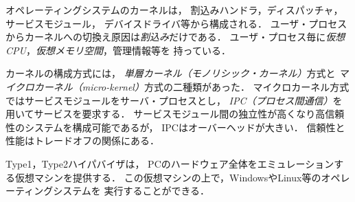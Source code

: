 オペレーティングシステムのカーネルは，
割込みハンドラ，ディスパッチャ，サービスモジュール，
デバイスドライバ等から構成される．
ユーザ・プロセスからカーネルへの切換え原因は\emph{割込み}だけである．
ユーザ・プロセス毎に\emph{仮想CPU}，\emph{仮想メモリ空間}，管理情報等を
持っている．

カーネルの構成方式には，
\emph{単層カーネル（モノリシック・カーネル）}方式と
\emph{マイクロカーネル（micro-kernel）}方式の二種類があった．
マイクロカーネル方式ではサービスモジュールをサーバ・プロセスとし，
\emph{IPC（プロセス間通信）}を用いてサービスを要求する．
サービスモジュール間の独立性が高くなり高信頼性のシステムを構成可能であるが，
IPCはオーバーヘッドが大きい．
信頼性と性能はトレードオフの関係にある．

Type1，Type2ハイパバイザは，
PCのハードウェア全体をエミュレーションする仮想マシンを提供する．
この仮想マシンの上で，WindowsやLinux等のオペレーティングシステムを
実行することができる．

